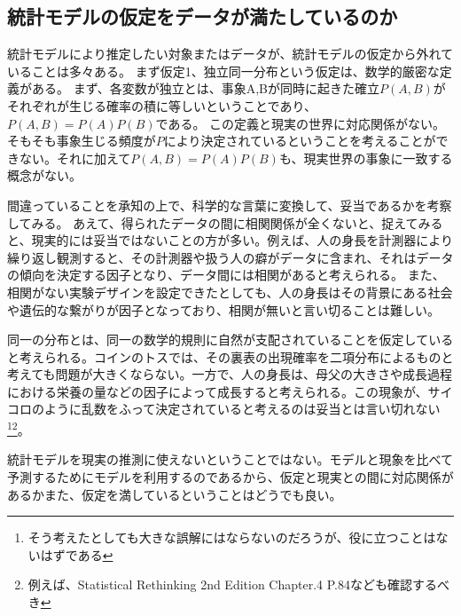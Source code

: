 \subsection{統計モデルの仮定をデータが満たしているのか}
統計モデルにより推定したい対象またはデータが、統計モデルの仮定から外れていることは多々ある。
まず仮定1、独立同一分布という仮定は、数学的厳密な定義がある。
まず、各変数が独立とは、事象A,Bが同時に起きた確立$P(A,B)$がそれぞれが生じる確率の積に等しいということであり、$P(A,B)=P(A)P(B)$である。
この定義と現実の世界に対応関係がない。
そもそも事象生じる頻度が$P$により決定されているということを考えることができない。それに加えて$P(A,B)=P(A)P(B)$も、現実世界の事象に一致する概念がない。

間違っていることを承知の上で、科学的な言葉に変換して、妥当であるかを考察してみる。
あえて、得られたデータの間に相関関係が全くないと、捉えてみると、現実的には妥当ではないことの方が多い。例えば、人の身長を計測器により繰り返し観測すると、その計測器や扱う人の癖がデータに含まれ、それはデータの傾向を決定する因子となり、データ間には相関があると考えられる。
また、相関がない実験デザインを設定できたとしても、人の身長はその背景にある社会や遺伝的な繋がりが因子となっており、相関が無いと言い切ることは難しい。

同一の分布とは、同一の数学的規則に自然が支配されていることを仮定していると考えられる。コインのトスでは、その裏表の出現確率を二項分布によるものと考えても問題が大きくならない。一方で、人の身長は、母父の大きさや成長過程における栄養の量などの因子によって成長すると考えられる。この現象が、サイコロのように乱数をふって決定されていると考えるのは妥当とは言い切れない\footnote{そう考えたとしても大きな誤解にはならないのだろうが、役に立つことはないはずである}\footnote{例えば、Statistical Rethinking 2nd Edition Chapter.4 P.84なども確認するべき}。

統計モデルを現実の推測に使えないということではない。モデルと現象を比べて予測するためにモデルを利用するのであるから、仮定と現実との間に対応関係があるかまた、仮定を満しているということはどうでも良い。

